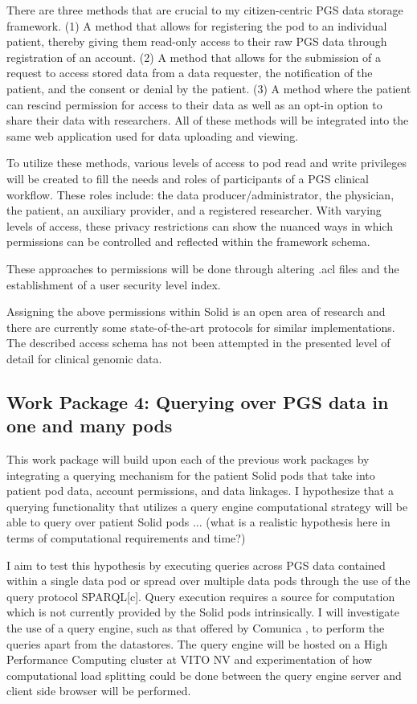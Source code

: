 \documentclass[runningheads]{llncs}
\begin{document}
There are three methods that are crucial to my citizen-centric PGS data storage framework.
(1) A method that allows for registering the pod to an individual patient, thereby giving them read-only access to their raw PGS data through registration of an account.
(2) A method that allows for the submission of a request to access stored data from a data requester, the notification of the patient, and the consent or denial by the patient.
(3) A method where the patient can rescind permission for access to their data as well as an opt-in option to share their data with researchers. 
All of these methods will be integrated into the same web application used for data uploading and viewing.

To utilize these methods, various levels of access to pod read and write privileges will be created to fill the needs and roles of participants of a PGS clinical workflow. 
These roles include: the data producer/administrator, the physician, the patient, an auxiliary provider, and a registered researcher.
With varying levels of access, these privacy restrictions can show the nuanced ways in which permissions can be controlled and reflected within the framework schema.

These approaches to permissions will be done through altering .acl files and the establishment of a user security level index.

Assigning the above permissions within Solid is an open area of research and there are currently some state-of-the-art protocols for similar implementations. 
The described access schema has not been attempted in the presented level of detail for clinical genomic data.


\subsection{Work Package 4: Querying over PGS data in one and many pods}

This work package will build upon each of the previous work packages by integrating a querying mechanism for the patient Solid pods that take into patient pod data, account permissions, and data linkages. 
I hypothesize that a querying functionality that utilizes a query engine computational strategy will be able to query over patient Solid pods ... (what is a realistic hypothesis here in terms of computational requirements and time?)

I aim to test this hypothesis by executing queries across PGS data contained within a single data pod or spread over multiple data pods through the use of the query protocol SPARQL[c].  
Query execution requires a source for computation which is not currently provided by the Solid pods intrinsically.
I will investigate the use of a query engine, such as that offered by Comunica \cite{comunica}, to perform the queries apart from the datastores.
The query engine will be hosted on a High Performance Computing cluster at VITO NV and experimentation of how computational load splitting could be done between the query engine server and client side browser will be performed. 
\end{document}
